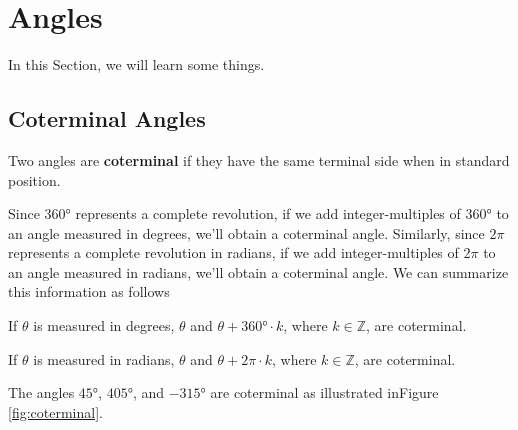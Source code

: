 
\section{Angles} \label{supplement-angles}
In this Section, we will learn some things.

\subsection*{Coterminal Angles} \label{supplement-coterminal-angles}
  \begin{myDefinition}
    Two angles are \textbf{coterminal} if they have the same terminal side when in standard position.
  \end{myDefinition}

      Since \ang{360} represents a complete revolution, if we add integer-multiples of \ang{360} to an angle measured in degrees, we'll obtain a coterminal angle. Similarly, since $2\pi$ represents a complete revolution in radians, if we add integer-multiples of $2\pi$ to an angle measured in radians, we'll obtain a coterminal angle. We can summarize this information as follows

      If $\theta$ is measured in degrees, $\theta$ and $\theta + \ang{360} \cdot k$, where $k\in\mathbb{Z}$, are coterminal.
    
      If $\theta$ is measured in radians, $\theta$ and $\theta + 2\pi \cdot k$, where $k\in\mathbb{Z}$, are coterminal.
    
      \begin{myExample}
        The angles $\ang{45}$, $\ang{405}$, and $\ang{-315}$ are coterminal as illustrated inFigure \ref{fig:coterminal}.
      \end{myExample}
      
